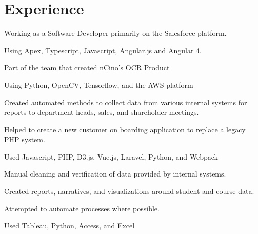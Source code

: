 \documentclass[]{deedy-resume-openfont}
\begin{document}
\begin{minipage}[t]{0.66\textwidth}


\section{Experience}

\vspace{\topsep} %
\begin{tightemize}
\item Working as a Software Developer primarily on the Salesforce platform. \item Using Apex, Typescript, Javascript, Angular.js and Angular 4.
\item Part of the team that created nCino's OCR Product
\item Using Python, OpenCV, Tensorflow, and the AWS platform
\end{tightemize}
\sectionsep

\begin{tightemize}
\item Created automated methods to collect data from various internal systems for reports to department heads, sales, and shareholder meetings.
\item Helped to create a new customer on boarding application to replace a legacy PHP system.
\item Used Javascript, PHP, D3.js, Vue.js, Laravel, Python, and Webpack
\end{tightemize}
\sectionsep

\begin{tightemize}
\item Manual cleaning and verification of data provided by internal systems.
\item Created reports, narratives, and visualizations around student and course data.
\item Attempted to automate processes where possible.
\item Used Tableau, Python, Access, and Excel
\end{tightemize}
\sectionsep


\end{minipage}
\end{document}
